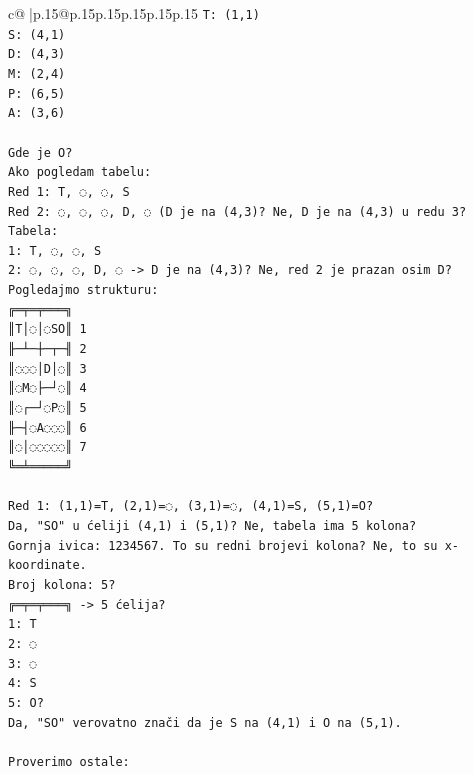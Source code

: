 \documentclass{article}
\begin{document}
{\begin{supertabular}{c@{$\;$}|p{.15\linewidth}@{}p{.15\linewidth}p{.15\linewidth}p{.15\linewidth}p{.15\linewidth}p{.15\linewidth}}
{{{\texttt{T: (1,1)} \\
\texttt{S: (4,1)} \\
\texttt{D: (4,3)} \\
\texttt{M: (2,4)} \\
\texttt{P: (6,5)} \\
\texttt{A: (3,6)} \\
\\ 
\texttt{Gde je O?} \\
\texttt{Ako pogledam tabelu:} \\
\texttt{Red 1: T, ◌, ◌, S} \\
\texttt{Red 2: ◌, ◌, ◌, D, ◌ (D je na (4,3)? Ne, D je na (4,3) u redu 3?} \\
\texttt{Tabela:} \\
\texttt{1: T, ◌, ◌, S} \\
\texttt{2: ◌, ◌, ◌, D, ◌ {-}> D je na (4,3)? Ne, red 2 je prazan osim D?} \\
\texttt{Pogledajmo strukturu:} \\
\texttt{╔═╤═╤═══╗} \\
\texttt{║T│◌│◌SO║ 1} \\
\texttt{╟─┴─┼─┬─╢ 2} \\
\texttt{║◌◌◌│D│◌║ 3} \\
\texttt{║◌M◌├─┘◌║ 4} \\
\texttt{║◌┌─┘◌P◌║ 5} \\
\texttt{╟─┤◌A◌◌◌║ 6} \\
\texttt{║◌│◌◌◌◌◌║ 7} \\
\texttt{╚═╧═════╝} \\
\\ 
\texttt{Red 1: (1,1)=T, (2,1)=◌, (3,1)=◌, (4,1)=S, (5,1)=O?} \\
\texttt{Da, "SO" u ćeliji (4,1) i (5,1)? Ne, tabela ima 5 kolona?} \\
\texttt{Gornja ivica: 1234567. To su redni brojevi kolona? Ne, to su x{-}koordinate.} \\
\texttt{Broj kolona: 5?} \\
\texttt{╔═╤═╤═══╗ {-}> 5 ćelija?} \\
\texttt{1: T} \\
\texttt{2: ◌} \\
\texttt{3: ◌} \\
\texttt{4: S} \\
\texttt{5: O?} \\
\texttt{Da, "SO" verovatno znači da je S na (4,1) i O na (5,1).} \\
\\ 
\texttt{Proverimo ostale:} \\
}}}
\end{supertabular}}
\end{document}
